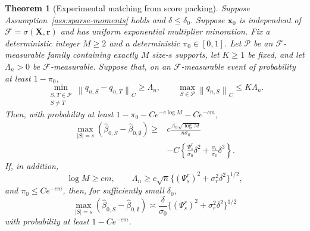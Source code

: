 \documentclass[a4paper,11pt,english]{article}
\newtheorem{theorem}{Theorem}[section]
\newcommand{\norm}[1]{\left\lVert #1\right\rVert}
\begin{document}
\begin{theorem}[Experimental matching from score packing]
\label{thm:experimental-score-matching}
Suppose Assumption~\ref{ass:sparse-moments} holds and
$\delta\le\delta_0$.  Suppose $\mathbf x_0$ is independent of
$\mathcal F=\sigma(\mathbf X,\mathbf r)$ and has uniform exponential multiplier
minoration.  Fix a deterministic integer $M\ge2$ and a deterministic
$\pi_0\in[0,1]$.  Let $\mathcal P$ be an $\mathcal F$-measurable family
containing exactly $M$ size-$s$ supports, let $K\ge1$ be fixed, and let
$\Lambda_n>0$ be $\mathcal F$-measurable.  Suppose that, on an
$\mathcal F$-measurable event of probability at least $1-\pi_0$,
\begin{equation}\label{eq:experimental-score-packing}
        \min_{\substack{S,T\in\mathcal P\\S\ne T}}
        \norm{q_{n,S}-q_{n,T}}_C\ge\Lambda_n,
        \qquad
        \max_{S\in\mathcal P}\norm{q_{n,S}}_C\le K\Lambda_n .
\end{equation}
Then, with probability at least
$1-\pi_0-Ce^{-c\log M}-Ce^{-cm}$,
\begin{equation}\label{eq:experimental-packing-lower}
\begin{split}
        \max_{|S|=s}
        (\hat\beta_{0,S}-\hat\beta_{0,\emptyset})
        \ge{}&
        c\frac{\Lambda_n\sqrt{\log M}}{n\sigma_0}\\
        &-C\left\{
        \frac{\Psi_s^r}{\sigma_0}\delta^2
        +\frac{\sigma_r}{\sigma_0}\delta^3
        \right\}.
\end{split}
\end{equation}
If, in addition,
\begin{equation}\label{eq:experimental-matching-bridge}
        \log M\ge cm,
        \qquad
        \Lambda_n\ge
        c\sqrt n\{(\Psi_s^r)^2+\sigma_r^2\delta^2\}^{1/2},
\end{equation}
and $\pi_0\le Ce^{-cm}$, then, for sufficiently small $\delta_0$,
\begin{equation}\label{eq:experimental-matching}
        \max_{|S|=s}
        (\hat\beta_{0,S}-\hat\beta_{0,\emptyset})
        \asymp
        \frac{\delta}{\sigma_0}
        \{(\Psi_s^r)^2+\sigma_r^2\delta^2\}^{1/2}
\end{equation}
with probability at least $1-Ce^{-cm}$.
\end{theorem}
\end{document}
